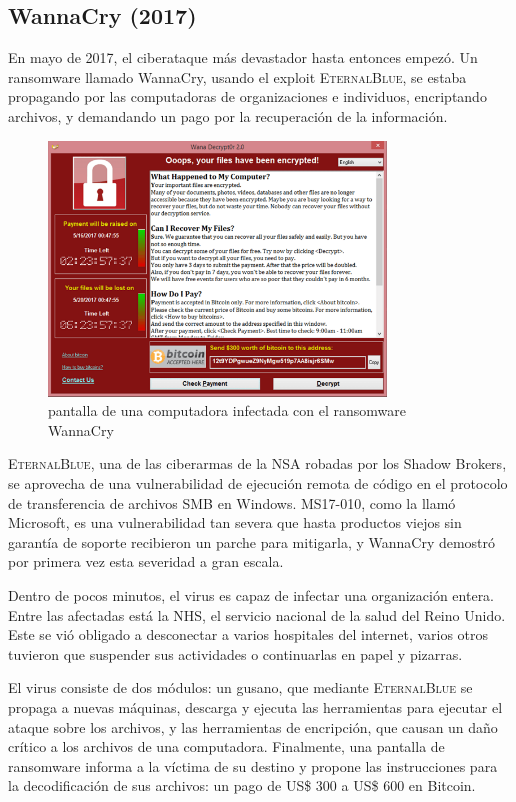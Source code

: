 \documentclass{article}
\begin{document}
\subsection{WannaCry (2017)}
En mayo de 2017, el ciberataque más devastador hasta entonces empezó. Un ransomware llamado WannaCry, usando el exploit \textsc{EternalBlue}, se estaba propagando por las computadoras de organizaciones e individuos, encriptando archivos, y demandando un pago por la recuperación de la información.

\begin{figure}[t]
    \centering
    \includegraphics[width=0.8\textwidth]{Wana_Decrypt0r.png}
    \caption{pantalla de una computadora infectada con el ransomware WannaCry}
\end{figure}

\textsc{EternalBlue}, una de las ciberarmas de la NSA robadas por los Shadow Brokers, se aprovecha de una vulnerabilidad de ejecución remota de código en el protocolo de transferencia de archivos SMB en Windows. MS17-010, como la llamó Microsoft, es una vulnerabilidad tan severa que hasta productos viejos sin garantía de soporte recibieron un parche para mitigarla, y WannaCry demostró por primera vez esta severidad a gran escala. \autocite{mandiant-mannacry}

Dentro de pocos minutos, el virus es capaz de infectar una organización entera. Entre las afectadas está la NHS, el servicio nacional de la salud del Reino Unido. Este se vió obligado a desconectar a varios hospitales del internet, varios otros tuvieron que suspender sus actividades o continuarlas en papel y pizarras. 

El virus consiste de dos módulos: un gusano, que mediante \textsc{EternalBlue} se propaga a nuevas máquinas, descarga y ejecuta las herramientas para ejecutar el ataque sobre los archivos, y las herramientas de encripción, que causan un daño crítico a los archivos de una computadora. Finalmente, una pantalla de ransomware informa a la víctima de su destino y propone las instrucciones para la decodificación de sus archivos: un pago de US\$ 300 a US\$ 600 en Bitcoin.
\end{document}
